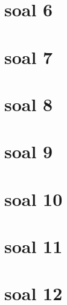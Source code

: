 \begin{enumerate}
\section*{soal 6}

\section*{soal 7}

\section*{soal 8}

\section*{soal 9}

\section*{soal 10}

\section*{soal 11}

\section*{soal 12}

 \end{enumerate}

